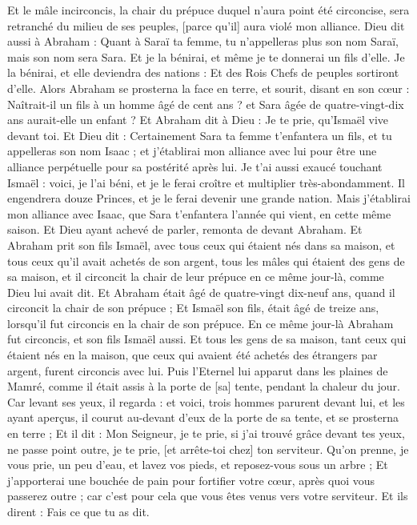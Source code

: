 \begin{multicols}{2}
Et le mâle incirconcis, la chair du prépuce duquel n'aura point été circoncise, sera retranché du milieu de ses peuples, [parce qu'il] aura violé mon alliance.
Dieu dit aussi à Abraham : Quant à Saraï ta femme, tu n'appelleras plus son nom Saraï, mais son nom sera Sara.
Et je la bénirai, et même je te donnerai un fils d'elle. Je la bénirai, et elle deviendra des nations : Et des Rois Chefs de peuples sortiront d'elle.
Alors Abraham se prosterna la face en terre, et sourit, disant en son cœur : Naîtrait-il un fils à un homme âgé de cent ans ? et Sara âgée de quatre-vingt-dix ans aurait-elle un enfant ?
Et Abraham dit à Dieu : Je te prie, qu'Ismaël vive devant toi.
Et Dieu dit : Certainement Sara ta femme t'enfantera un fils, et tu appelleras son nom Isaac ; et j'établirai mon alliance avec lui pour être une alliance perpétuelle pour sa postérité après lui.
Je t'ai aussi exaucé touchant Ismaël : voici, je l'ai béni, et je le ferai croître et multiplier très-abondamment. Il engendrera douze Princes, et je le ferai devenir une grande nation.
Mais j'établirai mon alliance avec Isaac, que Sara t'enfantera l'année qui vient, en cette même saison.
Et Dieu ayant achevé de parler, remonta de devant Abraham.
Et Abraham prit son fils Ismaël, avec tous ceux qui étaient nés dans sa maison, et tous ceux qu'il avait achetés de son argent, tous les mâles qui étaient des gens de sa maison, et il circoncit la chair de leur prépuce en ce même jour-là, comme Dieu lui avait dit.
Et Abraham était âgé de quatre-vingt dix-neuf ans, quand il circoncit la chair de son prépuce ;
Et Ismaël son fils, était âgé de treize ans, lorsqu'il fut circoncis en la chair de son prépuce.
En ce même jour-là Abraham fut circoncis, et son fils Ismaël aussi.
Et tous les gens de sa maison, tant ceux qui étaient nés en la maison, que ceux qui avaient été achetés des étrangers par argent, furent circoncis avec lui.
\VerseOne{}Puis l'Eternel lui apparut dans les plaines de Mamré, comme il était assis à la porte de [sa] tente, pendant la chaleur du jour.
Car levant ses yeux, il regarda : et voici, trois hommes parurent devant lui, et les ayant aperçus, il courut au-devant d'eux de la porte de sa tente, et se prosterna en terre ;
Et il dit : Mon Seigneur, je te prie, si j'ai trouvé grâce devant tes yeux, ne passe point outre, je te prie, [et arrête-toi chez] ton serviteur.
Qu'on prenne, je vous prie, un peu d'eau, et lavez vos pieds, et reposez-vous sous un arbre ;
Et j'apporterai une bouchée de pain pour fortifier votre cœur, après quoi vous passerez outre ; car c'est pour cela que vous êtes venus vers votre serviteur. Et ils dirent : Fais ce que tu as dit.

\end{multicols}
